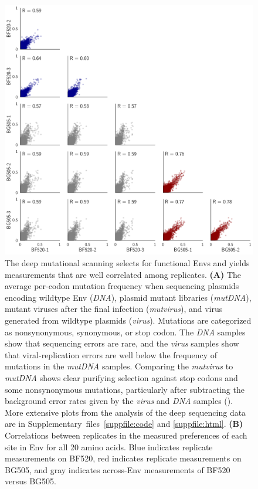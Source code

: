 \documentclass[9pt]{elife}
\begin{document}
\begin{figure}
\begin{minipage}[t]{0.65\textwidth}
\includegraphics[width=\textwidth]{figures/allprefscorr.pdf}
\end{minipage}
\caption{\label{fig:mutfreqs}
The deep mutational scanning selects for functional Envs and yields measurements that are well correlated among replicates.
{\bf (A)}
The average per-codon mutation frequency when sequencing plasmids encoding wildtype Env (\emph{DNA}), plasmid mutant libraries (\emph{mutDNA}), mutant viruses after the final infection (\emph{mutvirus}), and virus generated from wildtype plasmids (\emph{virus}).
Mutations are categorized as nonsynonymous, synonymous, or stop codon. 
The \emph{DNA} samples show that sequencing errors are rare, and the \emph{virus} samples show that viral-replication errors are well below the frequency of mutations in the \emph{mutDNA} samples.
Comparing the \emph{mutvirus} to \emph{mutDNA} shows clear purifying selection against stop codons and some nonsynonymous mutations, particularly after subtracting the background error rates given by the \emph{virus} and \emph{DNA} samples ().
More extensive plots from the analysis of the deep sequencing data are in Supplementary~files~\ref{suppfile:code} and \ref{suppfile:html}.
{\bf (B)}
Correlations between replicates in the measured preferences of each site in Env for all 20 amino acids.
Blue indicates replicate measurements on BF520, red indicates replicate measurements on BG505, and gray indicates across-Env measurements of BF520 versus BG505.
}
\end{figure}
\end{document}
